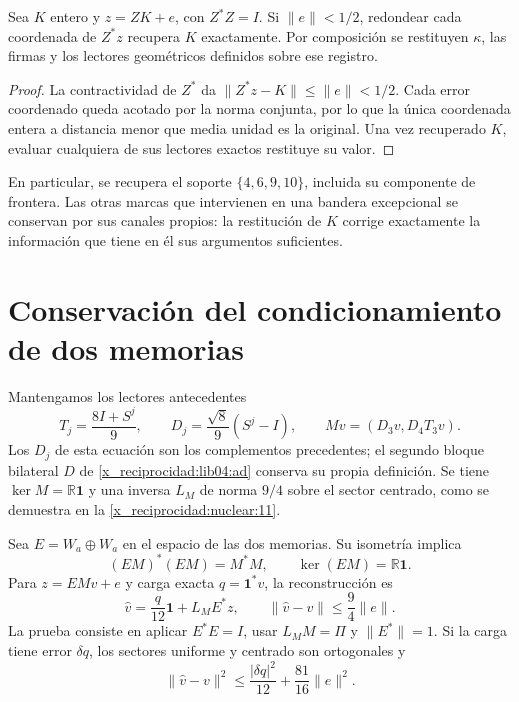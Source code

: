 \begin{proposition}
\label{x_reciprocidad:lib04:prop-redondeo}
Sea \(K\) entero y \(z=ZK+e\), con \(Z^*Z=I\). Si
\(\|e\|<1/2\), redondear cada coordenada de \(Z^*z\) recupera
\(K\) exactamente. Por composición se restituyen \(\kappa\), las
firmas y los lectores geométricos definidos sobre ese registro.
\end{proposition}

\begin{proof}
La contractividad de \(Z^*\) da
\(\|Z^*z-K\|\leq\|e\|<1/2\). Cada error coordenado queda
acotado por la norma conjunta, por lo que la única coordenada entera
a distancia menor que media unidad es la original. Una vez
recuperado \(K\), evaluar cualquiera de sus lectores exactos
restituye su valor.
\end{proof}

En particular, se recupera el soporte \(\{4,6,9,10\}\), incluida
su componente de frontera. Las otras marcas que intervienen en una
bandera excepcional se conservan por sus canales propios: la
restitución de \(K\) corrige exactamente la información que tiene
en él sus argumentos suficientes.

\section{Conservación del condicionamiento de dos memorias}
\label{x_reciprocidad:lib04:dos-memorias}

Mantengamos los lectores antecedentes
\begin{equation}
 T_j=\frac{8I+S^j}{9},\qquad
 D_j=\frac{\sqrt8}{9}(S^j-I),\qquad
 Mv=(D_3v,D_4T_3v).
 \label{x_reciprocidad:lib04:m-antecedente}
\end{equation}
Los \(D_j\) de esta ecuación son los complementos precedentes;
el segundo bloque bilateral \(D\) de \eqref{x_reciprocidad:lib04:ad} conserva
su propia definición. Se tiene \(\ker M=\mathbb R\mathbf1\)
y una inversa \(L_M\) de norma \(9/4\) sobre el sector centrado,
como se demuestra en la \cref{x_reciprocidad:nuclear:11}.

Sea \(E=W_a\oplus W_a\) en el espacio de las dos memorias.
Su isometría implica
\begin{equation}
 (EM)^*(EM)=M^*M,\qquad
 \ker(EM)=\mathbb R\mathbf1.
 \label{x_reciprocidad:lib04:gram-m-preservado}
\end{equation}
Para \(z=EMv+e\) y carga exacta
\(q=\mathbf1^*v\), la reconstrucción es
\begin{equation}
 \widehat v=\frac q{12}\mathbf1+L_ME^*z,\qquad
 \|\widehat v-v\|\leq\frac94\|e\|.
 \label{x_reciprocidad:lib04:inversa-m}
\end{equation}
La prueba consiste en aplicar \(E^*E=I\), usar
\(L_MM=\Pi\) y \(\|E^*\|=1\). Si la carga tiene error
\(\delta q\), los sectores uniforme y centrado son ortogonales y
\begin{equation}
 \|\widehat v-v\|^2
 \leq\frac{|\delta q|^2}{12}+\frac{81}{16}\|e\|^2.
 \label{x_reciprocidad:lib04:error-carga}
\end{equation}

